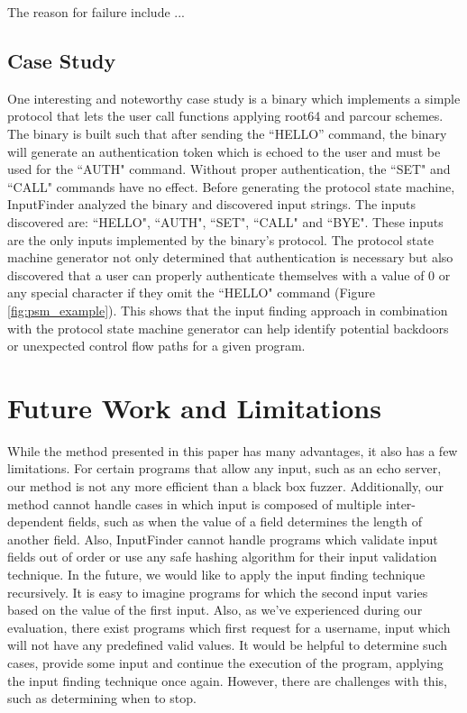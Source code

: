 \documentclass{acm_proc_article-sp}
\def \tool {InputFinder}
\begin{document}
The reason for failure include ...

\subsection{Case Study}
One interesting and noteworthy case study is a binary which implements a simple protocol that lets the user call functions applying root64 and parcour schemes.
The binary is built such that after sending the ``HELLO'' command, the binary will generate an authentication token which is echoed to the user and must be used for the ``AUTH" command.
Without proper authentication, the ``SET" and ``CALL" commands have no effect.
Before generating the protocol state machine, \tool{} analyzed the binary and discovered input strings.
The inputs discovered are: ``HELLO", ``AUTH", ``SET", ``CALL" and ``BYE".
These inputs are the only inputs implemented by the binary's protocol.
The protocol state machine generator not only determined that authentication is necessary but also discovered that a user can properly authenticate themselves with a value of 0 or any special character if they omit the ``HELLO" command (Figure \ref{fig:psm_example}).
This shows that the input finding approach in combination with the protocol state machine generator can help identify potential backdoors or unexpected control flow paths for a given program.

\section{Future Work and Limitations} \label{futurework}
While the method presented in this paper has many advantages, it also has a few limitations.
For certain programs that allow any input, such as an echo server, our method is not any more efficient than a black box fuzzer.
Additionally, our method cannot handle cases in which input is composed of multiple inter-dependent fields, such as when the value of a field determines the length of another field.
Also, \tool{} cannot handle programs which validate input fields out of order or use any safe hashing algorithm for their input validation technique. 
In the future, we would like to apply the input finding technique recursively.
It is easy to imagine programs for which the second input varies based on the value of the first input.
Also, as we've experienced during our evaluation, there exist programs which first request for a username, input which will not have any predefined valid values.
It would be helpful to determine such cases, provide some input and continue the execution of the program, applying the input finding technique once again.
However, there are challenges with this, such as determining when to stop.
\end{document}
